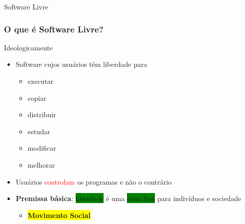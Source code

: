 \documentclass[xcolor=dvipsnames]{beamer}
\newcommand{\tred}[1]{\textcolor{red}{#1}}
\newcommand{\byellow}[1]{\colorbox{yellow}{#1}}
\newcommand{\bgreen}[1]{\colorbox{green}{#1}}
\begin{document}
\begin{frame}
\vspace{0.2cm}
\begin{center}
\Huge{Software Livre}
\end{center}
\end{frame}



\begin{frame}
	\frametitle{O que é Software Livre?}
	\begin{block}{Ideologicamente}
		  \begin{itemize}
		    \item Software cujos usuários têm liberdade para 
		    \begin{itemize}
		      \item executar
		      \item copiar
		      \item distribuir
		      \item estudar
		      \item modificar
    		      \item melhorar
		    \end{itemize}
		    \vspace{0.2cm}
		    \item Usuários \tred{controlam} os programas e não o 
contrário
		    \item {\bf Premissa básica}: \bgreen{liberdade} é uma 
\bgreen{coisa boa} para indivíduos e sociedade		    

\begin{itemize}
		    \item \byellow{\textbf{Movimento 
Social}}
		    \end{itemize}
		  \end{itemize}
	\end{block}
\end{frame}
\end{document}
